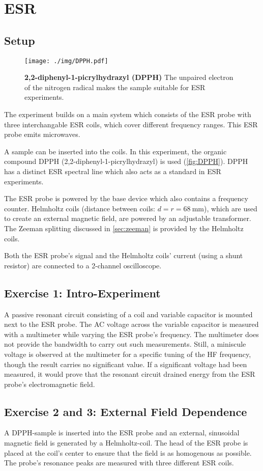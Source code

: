 \chapter{ESR}
\section{Setup}
\begin{figure}
	\centering
	\texttt{[image: ./img/DPPH.pdf]}
	\caption[]{\textbf{2,2-diphenyl-1-picrylhydrazyl (DPPH)} The unpaired electron of the nitrogen radical makes the sample suitable for ESR experiments.}
	\label{fig:DPPH}
\end{figure}
The experiment builds on a main system which consists of the ESR probe with three interchangable ESR coils, which cover different frequency ranges.
This ESR probe emits microwaves.

A sample can be inserted into the coils.
In this experiment, the organic compound DPPH (2,2-diphenyl-1-picrylhydrazyl) is used (\autoref{fig:DPPH}).
DPPH has a distinct ESR spectral line which also acts as a standard in ESR experiments.

The ESR probe is powered by the base device which also contains a frequency counter.
Helmholtz coils (distance between coils: $d=r=\SI{68}{\mm}$), which are used to create an external magnetic field, are powered by an adjustable transformer.
The Zeeman splitting discussed in \autoref{sec:zeeman} is provided by the Helmholtz coils.

Both the ESR probe's signal and the Helmholtz coils' current (using a shunt resistor) are connected to a 2-channel oscilloscope.

\section{Exercise 1: Intro-Experiment}
A passive resonant circuit consisting of a coil and variable capacitor is mounted next to the ESR probe.
The AC voltage across the variable capacitor is measured with a multimeter while varying the ESR probe's frequency.
The multimeter does not provide the bandwidth to carry out such measurements.
Still, a miniscule voltage is observed at the multimeter for a specific tuning of the HF frequency, though the result carries no significant value.
If a significant voltage had been measured, it would prove that the resonant circuit drained energy from the ESR probe's electromagnetic field.

\section{Exercise 2 and 3: External Field Dependence}
A DPPH-sample is inserted into the ESR probe and an external, sinusoidal magnetic field is generated by a Helmholtz-coil.
The head of the ESR probe is placed at the coil's center to ensure that the field is as homogenous as possible.
The probe's resonance peaks are measured with three different ESR coils.


